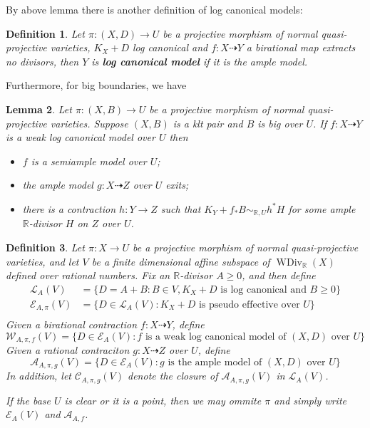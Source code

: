\documentclass[11pt]{amsart}
\newtheorem{defn}{Definition}[section]
\newtheorem{lem}[defn]{Lemma}
\begin{document}
By above lemma there is another definition of log canonical models:

\begin{defn}
  Let $ \pi:(X,D)\to U $ be a projective morphism of normal quasi-projective varieties, $ K_X+D $ log canonical and $ f:X\dashrightarrow Y $  a birational map extracts no divisors, then $ Y $ is \textbf{ log canonical model} if it is the ample model. 
\end{defn}

Furthermore, for big boundaries, we have
\begin{lem}\cite[Lemma 3.9.3]{BCHM10} Let $ \pi:(X,B)\to U $ be a projective morphism of normal quasi-projective varieties. Suppose $(X,B)$ is a klt pair and  $B$ is big over $U$. If $f:X\dashrightarrow Y$ is a weak log canonical model over $U$ then
  \begin{itemize}
    \item $f$ is a semiample model over $U$;
    \item  the ample model $g:X \dashrightarrow Z$ over $U$ exits;
    \item  there is a contraction $h:Y\to Z$ such that $K_{Y}+f_*B\sim_{\mathbb{R},U} h^*H$ for some ample $\mathbb{R}$-divisor $H$ on $Z$ over $U$.   
  \end{itemize}
\end{lem}
\begin{defn}\label{polytopeofdivisor}
  \cite[Definition 1.1.4]{BCHM10} Let $ \pi:X\to U $ be a projective morphism of normal quasi-projective varieties, and  let $ V $ be a finite dimensional affine subspace of $ \operatorname{WDiv}_{\mathbb{R}}(X) $ defined over rational numbers. Fix an $ \mathbb{R} $-divisor $ A\geqslant 0 $, and then define
  \[
    \begin{aligned}
      \mathcal{L}_A(V)&=\{D=A+B:B \in V,  K_X+D \text{ is log canonical and  } B\geqslant0 \}\\
      \mathcal{E}_{A,\pi}(V)&=\{D\in \mathcal{L}_A(V): K_X+D \text{ is pseudo effective over } U\}\\ 
    \end{aligned}
  \]
  Given a birational contraction $ f:X \dashrightarrow Y $, define
  \[ \mathcal{W}_{A,\pi,f}(V)=\{D\in \mathcal{E}_{A}(V): f \text{ is a weak log canonical model of  } (X,D) \text{ over }U\} \]
  Given a rational contraciton $g:X\dashrightarrow Z  $ over $ U $, define
  \[ \mathcal{A}_{A,\pi,g}(V)=\{D\in \mathcal{E}_{A}(V): g \text{ is the ample model of  } (X,D) \text{ over }U\} \]
  In addition, let $ \mathcal{C}_{A,\pi,g}(V) $ denote the closure of $ \mathcal{A}_{A,\pi,g}(V) $ in $\mathcal{L}_{A}(V)$.

  If the base $U$ is clear or it is a point, then we may ommite $\pi$ and simply write $\mathcal{E}_{A}(V)$ and $\mathcal{A}_{A,f}$.
\end{defn}
\end{document}
